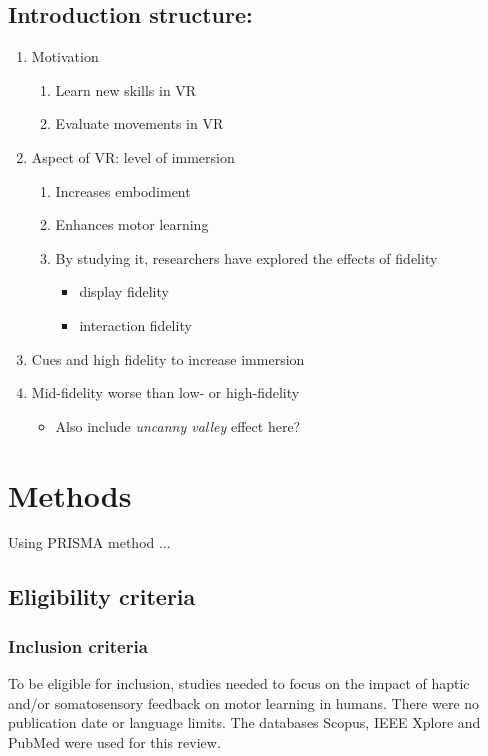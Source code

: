 \documentclass[conference]{IEEEtran}
\begin{document}
\subsection{Introduction structure:}
\begin{enumerate}
    \item Motivation
    \begin{enumerate}
        \item Learn new skills in VR
        \item Evaluate movements in VR
    \end{enumerate}
    \item Aspect of VR: level of immersion
    \begin{enumerate}
        \item Increases embodiment
        \item Enhances motor learning 
        \item By studying it, researchers have explored the effects of fidelity
        \begin{itemize}
            \item display fidelity
            \item interaction fidelity
        \end{itemize}
    \end{enumerate} 
    \item Cues and high fidelity to increase immersion
    \item Mid-fidelity worse than low- or high-fidelity
    \begin{itemize}
        \item Also include \textit{uncanny valley} effect here?
    \end{itemize}
\end{enumerate}
\vspace{5mm}

\section{Methods}

Using PRISMA method ...

\subsection{Eligibility criteria}
\subsubsection{Inclusion criteria}
To be eligible for inclusion, studies needed to focus on the impact of haptic and/or somatosensory feedback on motor learning in humans. There were no publication date or language limits. The databases Scopus, IEEE Xplore and PubMed were used for this review.
\end{document}
